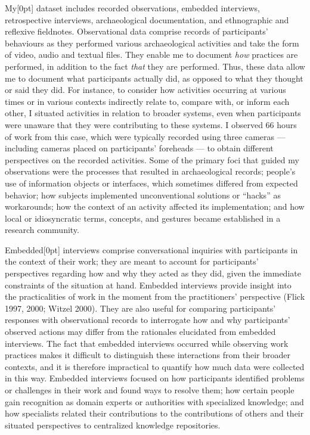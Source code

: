 \documentclass[
]{article}
\newcommand{\paragraphnumber}[1]{\marginnote{\color{lightgray}\tiny{#1}}[0pt]}
\begin{document}
My\paragraphnumber{[16]} dataset includes recorded observations,
embedded interviews, retrospective interviews, archaeological
documentation, and ethnographic and reflexive fieldnotes. Observational
data comprise records of participants' behaviours as they performed
various archaeological activities and take the form of video, audio and
textual files. They enable me to document \emph{how} practices are
performed, in addition to the fact \emph{that} they are performed. Thus,
these data allow me to document what participants actually did, as
opposed to what they thought or said they did. For instance, to consider
how activities occurring at various times or in various contexts
indirectly relate to, compare with, or inform each other, I situated
activities in relation to broader systems, even when participants were
unaware that they were contributing to these systems. I observed 66
hours of work from this case, which were typically recorded using three
cameras --- including cameras placed on participants' foreheads --- to
obtain different perspectives on the recorded activities. Some of the
primary foci that guided my observations were the processes that
resulted in archaeological records; people's use of information objects
or interfaces, which sometimes differed from expected behavior; how
subjects implemented unconventional solutions or ``hacks'' as
workarounds; how the context of an activity affected its implementation;
and how local or idiosyncratic terms, concepts, and gestures became
established in a research community.

Embedded\paragraphnumber{[17]} interviews comprise conversational
inquiries with participants in the context of their work; they are meant
to account for participants' perspectives regarding how and why they
acted as they did, given the immediate constraints of the situation at
hand. Embedded interviews provide insight into the practicalities of
work in the moment from the practitioners' perspective (Flick 1997,
2000; Witzel 2000). They are also useful for comparing participants'
responses with observational records to interrogate how and why
participants' observed actions may differ from the rationales elucidated
from embedded interviews. The fact that embedded interviews occurred
while observing work practices makes it difficult to distinguish these
interactions from their broader contexts, and it is therefore
impractical to quantify how much data were collected in this way.
Embedded interviews focused on how participants identified problems or
challenges in their work and found ways to resolve them; how certain
people gain recognition as domain experts or authorities with
specialized knowledge; and how specialists related their contributions
to the contributions of others and their situated perspectives to
centralized knowledge repositories.
\end{document}
